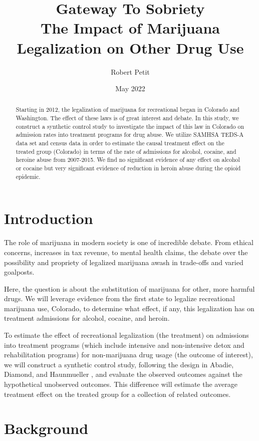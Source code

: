 \documentclass{article}
\title{Gateway To Sobriety \\
    \large The Impact of Marijuana Legalization on Other Drug Use}
\author{Robert Petit}
\date{May 2022}
\begin{document}
\maketitle

\begin{abstract}
    Starting in 2012, the legalization of marijuana for recreational began in Colorado and Washington. The effect of these laws is of great interest and debate. In this study, we construct a synthetic control study to investigate the impact of this law in Colorado on admission rates into treatment programs for drug abuse. We utilize SAMHSA TEDS-A data set and census data in order to estimate the causal treatment effect on the treated group (Colorado) in terms of the rate of admissions for alcohol, cocaine, and heroine abuse from 2007-2015. We find no significant evidence of any effect on alcohol or cocaine but very significant evidence of reduction in heroin abuse during the opioid epidemic.
\end{abstract}

\section{Introduction}

The role of marijuana in modern society is one of incredible debate. From ethical concerns, increases in tax revenue, to mental health claims, the debate over the possibility and propriety of legalized marijuana awash in trade-offs and varied goalposts.

Here, the question is about the substitution of marijuana for other, more harmful drugs. We will leverage evidence from the first state to legalize recreational marijuana use, Colorado, to determine what effect, if any, this legalization has on treatment admissions for alcohol, cocaine, and heroin.

To estimate the effect of recreational legalization (the treatment) on admissions into treatment programs (which include intensive and non-intensive detox and rehabilitation programs) for non-marijuana drug usage (the outcome of interest), we will construct a synthetic control study, following the design in Abadie, Diamond, and Haunmueller \citeyearpar{SynthControl}, and evaluate the observed outcomes against the hypothetical unobserved outcomes. This difference will estimate the average treatment effect on the treated group for a collection of related outcomes.

\section{Background}
\end{document}
